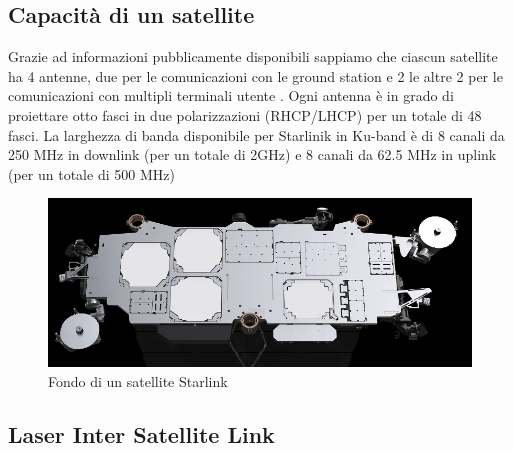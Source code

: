 
\subsection{Capacità di un satellite}

Grazie ad informazioni pubblicamente disponibili sappiamo che ciascun satellite ha 4 antenne, due per le comunicazioni con le ground station e 2 le altre 2 per le comunicazioni con multipli terminali utente \cite{branch_education_how_2022}.
Ogni antenna è in grado di proiettare otto fasci in due polarizzazioni (RHCP/LHCP) per un totale di 48 fasci.
La larghezza di banda disponibile per Starlinik in \ac{Ku}-band è di 8 canali da 250 MHz in downlink (per un totale di 2GHz) e 8 canali da 62.5 MHz in uplink (per un totale di 500 MHz)

\begin{figure}[htbp]
  \centering
  \includegraphics[width=0.9\linewidth]{./res/img/starlink_satellite_back.png}
  \caption{Fondo di un satellite Starlink \cite{mike_puchol_modeling_2022}}
  \label{fig:starlink-satellite}
\end{figure}

\subsection{Laser Inter Satellite Link}

